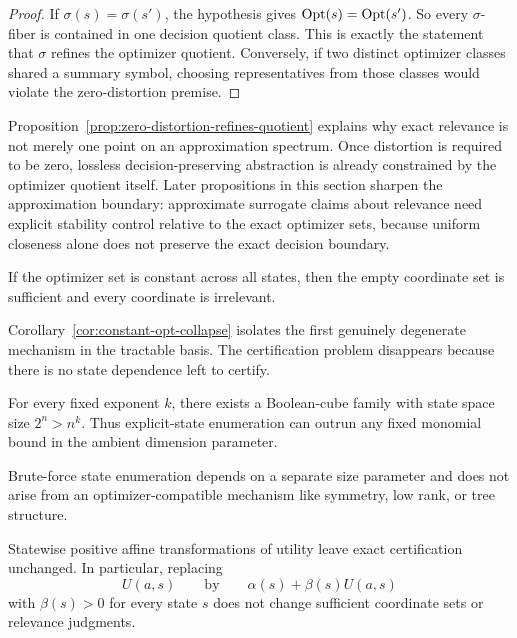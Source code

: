\begin{proof}
If $\sigma(s)=\sigma(s')$, the hypothesis gives $\operatorname{Opt}(s)=\operatorname{Opt}(s')$. So every $\sigma$-fiber is contained in one decision quotient class. This is exactly the statement that $\sigma$ refines the optimizer quotient. Conversely, if two distinct optimizer classes shared a summary symbol, choosing representatives from those classes would violate the zero-distortion premise.
\end{proof}

Proposition~\ref{prop:zero-distortion-refines-quotient} explains why exact relevance is not merely one point on an approximation spectrum. Once distortion is required to be zero, lossless decision-preserving abstraction is already constrained by the optimizer quotient itself. Later propositions in this section sharpen the approximation boundary: approximate surrogate claims about relevance need explicit stability control relative to the exact optimizer sets, because uniform closeness alone does not preserve the exact decision boundary.

\begin{corollary}\label{cor:constant-opt-collapse}
If the optimizer set is constant across all states, then the empty coordinate set is sufficient and every coordinate is irrelevant.
\end{corollary}

Corollary~\ref{cor:constant-opt-collapse} isolates the first genuinely degenerate mechanism in the tractable basis. The certification problem disappears because there is no state dependence left to certify.

\begin{proposition}\label{prop:enumeration-not-structural}
For every fixed exponent $k$, there exists a Boolean-cube family with state space size $2^n > n^k$. Thus explicit-state enumeration can outrun any fixed monomial bound in the ambient dimension parameter.
\end{proposition}

Brute-force state enumeration depends on a separate size parameter and does not arise from an optimizer-compatible mechanism like symmetry, low rank, or tree structure.

\begin{proposition}\label{prop:affine-invisible}
Statewise positive affine transformations of utility leave exact certification unchanged. In particular, replacing
\[
U(a,s)
\qquad\text{by}\qquad
\alpha(s)+\beta(s)U(a,s)
\]
with $\beta(s)>0$ for every state $s$ does not change sufficient coordinate sets or relevance judgments.
\end{proposition}

